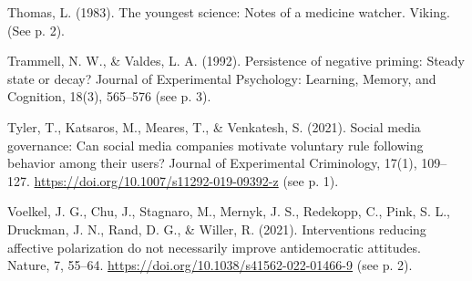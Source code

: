 \documentclass[reflection, authordate,issue]{jote-new-article}
\begin{document}
Thomas, L. (1983). The youngest science: Notes of a medicine watcher. Viking. (See p. 2).

Trammell, N. W., \& Valdes, L. A. (1992). Persistence of negative priming: Steady state or decay? Journal of Experimental Psychology: Learning, Memory, and Cognition, 18(3), 565–576 (see p. 3).

Tyler, T., Katsaros, M., Meares, T., \& Venkatesh, S. (2021). Social media governance: Can social media companies motivate voluntary rule following behavior among their users? Journal of Experimental Criminology, 17(1), 109–127. \url{https://doi.org/10.1007/s11292-019-09392-z} (see p. 1).

Voelkel, J. G., Chu, J., Stagnaro, M., Mernyk, J. S., Redekopp, C., Pink, S. L., Druckman, J. N., Rand, D. G., \& Willer, R. (2021). Interventions reducing affective polarization do not necessarily improve antidemocratic attitudes. Nature, 7, 55–64. \url{https://doi.org/10.1038/s41562-022-01466-9} (see p. 2).
\end{document}
